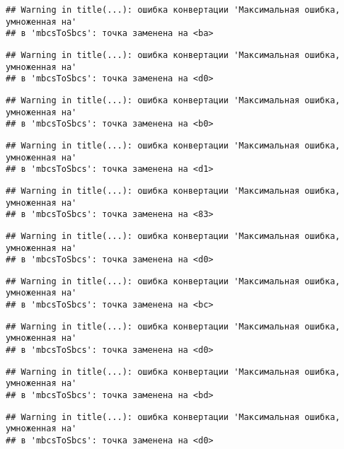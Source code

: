 \documentclass[
]{article}
\begin{document}
\begin{verbatim}
## Warning in title(...): ошибка конвертации 'Максимальная ошибка, умноженная на'
## в 'mbcsToSbcs': точка заменена на <ba>
\end{verbatim}

\begin{verbatim}
## Warning in title(...): ошибка конвертации 'Максимальная ошибка, умноженная на'
## в 'mbcsToSbcs': точка заменена на <d0>
\end{verbatim}

\begin{verbatim}
## Warning in title(...): ошибка конвертации 'Максимальная ошибка, умноженная на'
## в 'mbcsToSbcs': точка заменена на <b0>
\end{verbatim}

\begin{verbatim}
## Warning in title(...): ошибка конвертации 'Максимальная ошибка, умноженная на'
## в 'mbcsToSbcs': точка заменена на <d1>
\end{verbatim}

\begin{verbatim}
## Warning in title(...): ошибка конвертации 'Максимальная ошибка, умноженная на'
## в 'mbcsToSbcs': точка заменена на <83>
\end{verbatim}

\begin{verbatim}
## Warning in title(...): ошибка конвертации 'Максимальная ошибка, умноженная на'
## в 'mbcsToSbcs': точка заменена на <d0>
\end{verbatim}

\begin{verbatim}
## Warning in title(...): ошибка конвертации 'Максимальная ошибка, умноженная на'
## в 'mbcsToSbcs': точка заменена на <bc>
\end{verbatim}

\begin{verbatim}
## Warning in title(...): ошибка конвертации 'Максимальная ошибка, умноженная на'
## в 'mbcsToSbcs': точка заменена на <d0>
\end{verbatim}

\begin{verbatim}
## Warning in title(...): ошибка конвертации 'Максимальная ошибка, умноженная на'
## в 'mbcsToSbcs': точка заменена на <bd>
\end{verbatim}

\begin{verbatim}
## Warning in title(...): ошибка конвертации 'Максимальная ошибка, умноженная на'
## в 'mbcsToSbcs': точка заменена на <d0>
\end{verbatim}
\end{document}
